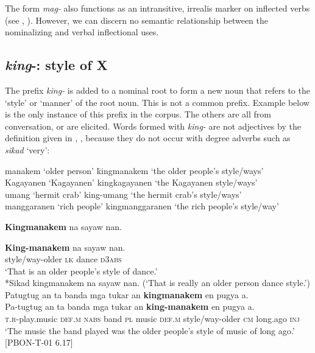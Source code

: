 The form \textit{mag-} also functions as an intransitive, irrealis marker on inflected verbs (see , ). However, we can discern no semantic relationship between the nominalizing and verbal inflectional uses.

\subsection{\textit{king}-: style of X}
\label{sec:king}

The prefix \textit{king-} is added to a nominal root to form a new noun that refers to the ‘style’ or ‘manner’ of the root noun. This is not a common prefix. Example  below is the only instance of this prefix in the corpus. The others are all from conversation, or are elicited. Words formed with \textit{king-} are not adjectives by the definition given in , , because they do not occur with degree adverbs such as \textit{sikad} ‘very’:

\ea
\begin{tabbing}
manakem   ‘older person’\hspace{.5cm} \= kingmanakem   ‘the older people’s style/ways’ \\
Kagayanen   ‘Kagayanen’ \> kingkagayanen   ‘the Kagayanen style/ways’ \\
umang   ‘hermit crab’ \>  king{}-umang  ‘the hermit crab’s style/ways’ \\
manggaranen  ‘rich people’ \> kingmanggaranen  ‘the rich people’s style/way’
\end{tabbing}
\z
\ea
\textbf{Kingmanakem}  na  sayaw  nan. \\\smallskip

\gll \textbf{King-manakem}  na  sayaw  nan. \\
style/way-older  \textsc{lk}  dance \textsc{d}3\textsc{abs} \\
\glt ‘That is an older people’s style of dance.' \\
*Sikad kingmanakem na sayaw nan. (‘That is really an older person dance style.’)
\z
\ea
\label{bkm:Ref116461310}
Patugtug  an  ta  banda  mga  tukar  an \textbf{kingmanakem}  en  pugya  a.\\\smallskip
\gll Pa-tugtug  an  ta  banda  mga  tukar  an \textbf{king-manakem}  en  pugya  a. \\
\textsc{t.r}-play.music  \textsc{def.m}  \textsc{nabs}  band  \textsc{pl}  music  \textsc{def.m} style/way-older  \textsc{cm} long.ago  \textsc{inj} \\
\glt `The music the band played was the older people’s style of music of long ago.’ [PBON-T-01 6.17]
\z

